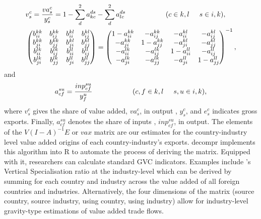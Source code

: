 \documentclass{article}
\begin{document}
\begin{align*}
&v_{s}^{c} = \frac{va_{s}^{c}}{y_{s}^{c}} = 1 - \sum_{d}^{2}{a_{kc}^{ds}} - \sum_{d}^{2}{a_{lc}^{ds}} \hspace{2cm} (c \in k,l \hspace{.5cm} s \in i,k),\\
&\begin{pmatrix}
b_{ii}^{kk}& b_{ij}^{kk}& b_{ii}^{kl}& b_{ij}^{kl}\\
b_{ji}^{kk}& b_{jj}^{kk}& b_{ji}^{kl}& b_{jj}^{kl}\\
b_{ii}^{lk}& b_{ij}^{lk}& b_{ii}^{ll}& b_{ij}^{ll}\\
b_{ji}^{lk}& b_{jj}^{lk}& b_{ji}^{ll}& b_{jj}^{ll}
\end{pmatrix}
=
\begin{pmatrix}
1-a_{ii}^{kk}& -a_{ij}^{kk}& -a_{ii}^{kl}& -a_{ij}^{kl}\\
-a_{ji}^{kk}& 1-a_{jj}^{kk}& -a_{ji}^{kl}& -a_{jj}^{kl}\\
-a_{ii}^{lk}& -a_{ij}^{lk}& 1-a_{ii}^{ll}& -a_{ij}^{ll}\\
-a_{ji}^{lk}& -a_{jj}^{lk}& -a_{ji}^{ll}& 1-a_{jj}^{ll}
\end{pmatrix}^{-1},
\end{align*}
and
\begin{equation*}
a_{cf}^{su} = \frac{inp_{cf}^{su}}{y_{f}^{u}}  \hspace{2cm} (c,f \in k,l \hspace{.5cm} s,u \in i,k),
\end{equation*}
where \(v_{s}^{c}\) gives the share of value added, \(va_{s}^{c}\), in output , \(y_{s}^{c}\), and \(e_{s}^{c}\) indicates gross exports. Finally, \(a_{cf}^{su}\) denotes the share of inputs , \(inp_{cf}^{su}\), in output. The elements of the \(V(I-A)^{-1}E\) or \(vax\) matrix are our estimates for the country-industry level value added origins of each country-industry's exports. decompr implements this algorithm into R to automate the process of deriving the matrix. Equipped with it, researchers can calculate standard GVC indicators. Examples include \citet{dahuetal01}'s Vertical Specialisation ratio at the industry-level which can be derived by summing for each country and industry across the value added of all foreign countries and industries. Alternatively, the four dimensions of the matrix (source country, source industry, using country, using industry) allow for industry-level gravity-type estimations of value added trade flows.
\end{document}
